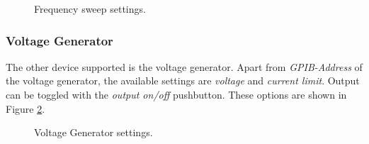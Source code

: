 \begin{figure}[H]
\centering
{}
\caption{Frequency sweep settings.}
\label{fig:freqsw}
\end{figure}

\subsubsection*{Voltage Generator}
The other device supported is the voltage generator. Apart from \emph{GPIB-Address} of the voltage generator, the available settings are \emph{voltage} and \emph{current limit}. Output can be toggled with the \emph{output on/off} pushbutton. These options are shown in Figure \ref{fig:voltgen}.

\begin{figure}[H]
\centering
{}
\caption{Voltage Generator settings.}
\label{fig:voltgen}
\end{figure}

\ifdefined\master
\else
	
\fi
